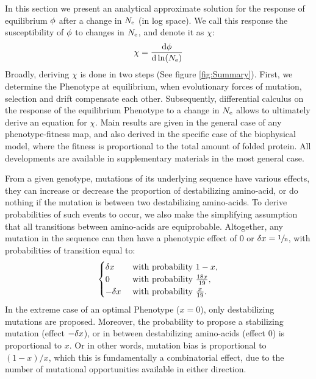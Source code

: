 In this section we present an analytical approximate solution for the response of equilibrium $\phi$ after a change in $N_{\mathrm{e}}$ (in log space).
We call this response the susceptibility of $\phi$ to changes in $N_{\mathrm{e}}$, and denote it as $\chi$:
\begin{align}
    \chi = \frac{ \der \avgpfix}{\der \ln (\Ne)} \label{eq:chi}
\end{align}
Broadly, deriving $\chi$ is done in two steps (See figure \ref{fig:Summary}).
First, we determine the \gls{Phenotype} at equilibrium, when evolutionary forces of mutation, selection and \gls{drift} compensate each other.
Subsequently, differential calculus on the response of the equilibrium \gls{Phenotype} to a change in $N_{\mathrm{e}}$ allows to ultimately derive an equation for $\chi$.
Main results are given in the general case of any phenotype-fitness map, and also derived in the specific case of the biophysical model, where the fitness is proportional to the total amount of folded protein.
All developments are available in supplementary materials in the most general case.

From a given genotype, mutations of its underlying sequence have various effects, they can increase or decrease the proportion of destabilizing amino-acid, or do nothing if the mutation is between two destabilizing amino-acids.
To derive probabilities of such events to occur, we also make the simplifying assumption that all {transitions} between amino-acids are equiprobable.
Altogether, any mutation in the sequence can then have a phenotypic effect of $0$ or $\delta x=\sfrac{1}{\text{n}}$, with probabilities of {transition} equal to:
\begin{gather}
    \begin{cases}
        \dx &\text{ with probability } 1-x, \\
        0 &\text{ with probability } \frac{18 x }{19}, \\
        -\dx &\text{ with probability } \frac{x}{19}.\\
    \end{cases} \label{eq:proba}
\end{gather}
In the extreme case of an optimal \gls{Phenotype} ($x = 0$), only destabilizing mutations are proposed.
Moreover, the probability to propose a stabilizing mutation (effect $-\delta x$), or in between destabilizing amino-acids (effect $0$) is proportional to $x$.
Or in other words, mutation bias is proportional to $(1-x)/x$, which this is fundamentally a combinatorial effect, due to the number of mutational opportunities available in either direction.


